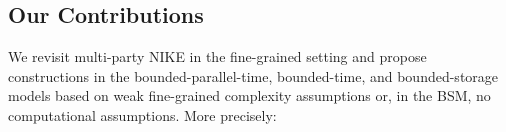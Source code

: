 %
%
%
%
%
\subsection{Our Contributions}
We revisit multi-party NIKE in the fine-grained setting and propose constructions in the bounded-parallel-time, bounded-time, and bounded-storage models based on weak fine-grained complexity assumptions or, in the BSM, no computational assumptions. More precisely:

